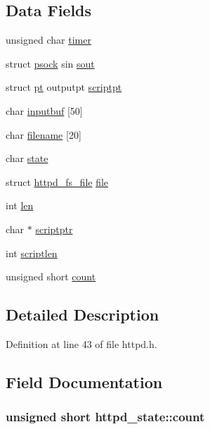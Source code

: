 \subsection*{Data Fields}
\begin{DoxyCompactItemize}
\item 
unsigned char \hyperlink{structhttpd__state_ac39694ece9526b84012f90f2bb00af9f}{timer}
\item 
struct \hyperlink{structpsock}{psock} sin \hyperlink{structhttpd__state_a9dd8edeece221c853a4c4516bf1b01c2}{sout}
\item 
struct \hyperlink{structpt}{pt} outputpt \hyperlink{structhttpd__state_ae261f08e1556287d241764fb2e99fc26}{scriptpt}
\item 
char \hyperlink{structhttpd__state_a4c6f843219271d25766ee5969e435d1a}{inputbuf} \mbox{[}50\mbox{]}
\item 
char \hyperlink{structhttpd__state_a447eb700ea7a185e0f155934995d49e5}{filename} \mbox{[}20\mbox{]}
\item 
char \hyperlink{structhttpd__state_a94fcc9f5c47f419040d849ce58beae35}{state}
\item 
struct \hyperlink{structhttpd__fs__file}{httpd\_\-fs\_\-file} \hyperlink{structhttpd__state_a5e274a8f8b5fb2b3999c54fe27c76e46}{file}
\item 
int \hyperlink{structhttpd__state_a468c04fff28e784f93ebc3f0849211dd}{len}
\item 
char $\ast$ \hyperlink{structhttpd__state_a78f82878f3fd0e7401c7d7d3b3fefbef}{scriptptr}
\item 
int \hyperlink{structhttpd__state_a16a3a3056f44b7245ce085b937a269dd}{scriptlen}
\item 
unsigned short \hyperlink{structhttpd__state_a6df929b448ea98bc44d41f5e96237bda}{count}
\end{DoxyCompactItemize}


\subsection{Detailed Description}


Definition at line 43 of file httpd.h.



\subsection{Field Documentation}
\hypertarget{structhttpd__state_a6df929b448ea98bc44d41f5e96237bda}{
\subsubsection[{count}]{\setlength{\rightskip}{0pt plus 5cm}unsigned short {\bf httpd\_\-state::count}}}
\label{structhttpd__state_a6df929b448ea98bc44d41f5e96237bda}


